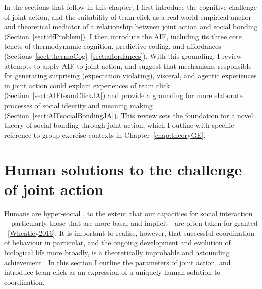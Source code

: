 \begin{CJK}{UTF8}{gbsn}

In the sections that follow in this chapter, I first introduce the cognitive challenge of joint action, and the suitability of team  click as a real-world empirical anchor and theoretical mediator of a relationship between joint action and social bonding (Section~\ref{sect:dfProblem}).  I then introduce the AIF, including its three core tenets of thermodynamic cognition, predictive coding, and affordances (Sections~\ref{sect:thermoCog}\nobreakdash~\ref{sect:affordances}).  With this grounding, I review attempts to apply AIF to joint action, and suggest that mechanisms responsible for generating surprising (expectation violating), visceral, and agentic experiences in joint action could explain experiences of team click (Section~\ref{sect:AIFteamClickJA}) and provide a grounding for more elaborate processes of social identity and meaning making (Section~\ref{sect:AIFsocialBondingJA}).  This review sets the foundation for a novel theory of social bonding through joint action, which I outline with specific reference to group exercise contexts in Chapter~\ref{chap:theoryGE}.



\section{Human solutions to the challenge of joint action\label{sect:dfProblem}}
Humans are hyper-social \citep{Tomasello2012a}, to the extent that our capacities for social interaction---particularly those that are more basal and implicit---are often taken for granted ~\ref{Wheatley2016}.  It is important to realise, however, that successful coordination of behaviour in particular, and the ongoing development and evolution of biological life more broadly, is a theoretically improbable and astounding achievement \citep{Schrodinger1944}.  In this section I outline the parameters of joint action, and introduce team click as an expression of a uniquely human solution to coordination.


\end{CJK}
